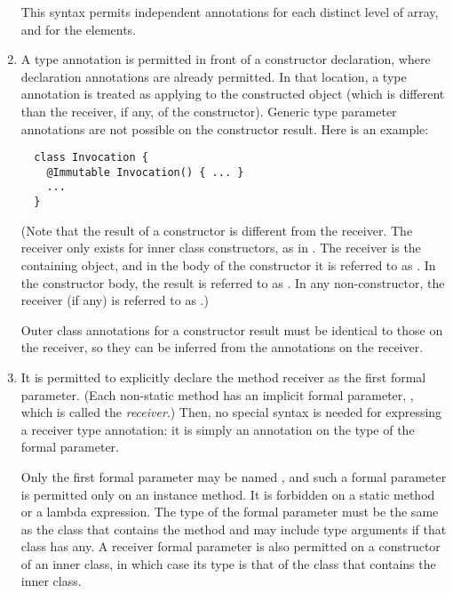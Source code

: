 \documentclass[10pt]{article}
\begin{document}
\begin{enumerate}
\preverbnegspace
This syntax permits independent annotations for each distinct level of
array, and for the elements.

\item
A type annotation is permitted in front of a constructor
declaration, where declaration annotations are already permitted.  In that
location, a type annotation is treated as applying to the constructed
object (which is different than the receiver, if any, of the constructor).
Generic type parameter annotations are not
possible on the constructor result.
%
  Here is an example:
\preverbnegspace
\begin{Verbatim}
  class Invocation {
    @Immutable Invocation() { ... }
    ...
  }
\end{Verbatim}
\preverbnegspace

(Note that the result of a constructor is different from the receiver.  The
receiver only exists for inner class constructors, as in
.  The receiver is the containing
object, and in the body of the constructor it is referred to as
.  In the constructor body, the result is referred to as
.  In any non-constructor, the receiver (if any) is referred to
as .)

Outer class annotations for a constructor result must be identical to
those on the receiver, so they can be inferred from the annotations on the
receiver.

\item
  \label{type-annotation-locations-receiver}%
  It is permitted to explicitly declare the method receiver as the first
  formal parameter.
  (Each non-static method has an implicit formal parameter, , which is
  called the \emph{receiver}.)
  Then, no special
  syntax is needed for expressing a receiver type annotation:  it is simply an
  annotation on the type of the  formal parameter.

  Only the first formal parameter may be
  named , and such a formal parameter is permitted only on an instance
  method.  It is forbidden on a static method or a lambda expression.  The type
  of the  formal parameter must be the same as the class that contains
  the method and may include type arguments if that class has any.
  A receiver  formal parameter is also permitted on a
  constructor of an inner class, in which case its type is that of the
  class that contains the inner class.


\end{enumerate}
\end{document}
